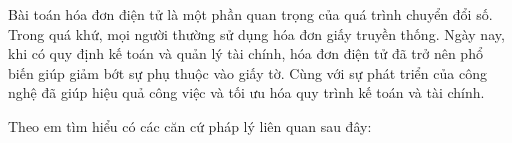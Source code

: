 Bài toán hóa đơn điện tử là một phần quan trọng của quá trình chuyển đổi số. Trong quá khứ, mọi người thường sử dụng hóa đơn giấy truyền thống. Ngày nay, khi có quy định kế toán và quản lý tài chính, hóa đơn điện tử đã trở nên phổ biến giúp giảm bớt sự phụ thuộc vào giấy tờ. Cùng với sự phát triển của công nghệ đã giúp hiệu quả công việc và tối ưu hóa quy trình kế toán và tài chính.

Theo em tìm hiểu có các căn cứ pháp lý liên quan sau đây: